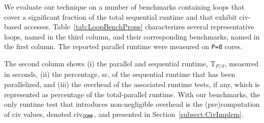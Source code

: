 \documentclass[10pt,nocopyrightspace]{sigplanconf}
\begin{document}
We evaluate our technique on a number of benchmarks containing loops that cover a significant
fraction of the total sequential runtime and that exhibit {\sc civ}-based accesses.
%
Table~\ref{tab:LoopBenchProps} characterizes several representative loops, named in 
the third column, and their corresponding benchmarks, named in the first column.
The reported parallel runtime were measured on {\tt P=8} cores.
%

The second column shows 
(i)   the parallel and sequential runtime, T$_{P/S}$, measured in seconds,
(ii)  the percentage, {\sc sc}, of the sequential runtime that has been parallelized, and 
(iii) the overhead of the associated runtime tests, if any, which is represented as percentage of
        the total-parallel runtime. With our benchmarks, the only runtime test that introduces
        non-negligible overhead is the (pre)computation of {\sc civ} values, 
        denoted {\sc civ}$_{\tt{}COMP}$, and presented in Section~\ref{subsect:CivImplem}.   


\end{document}
